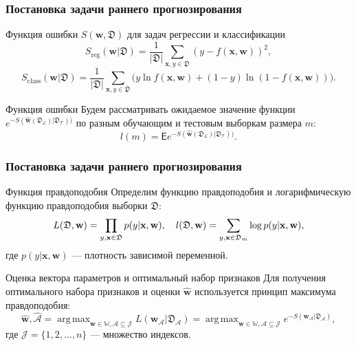 \documentclass{beamer}
\DeclareMathOperator*{\argmax}{arg\,max}
\begin{document}
\begin{frame}
\frametitle{Постановка задачи раннего прогнозирования}

\begin{block}{Функция ошибки $S(\mathbf{w}, \mathfrak{D})$ для задач регрессии и классификации}
$$
S_{\text{reg}}(\textbf{w} | \mathfrak{D}) = \frac{1}{|\mathfrak{D}|}\sum\limits_{\mathbf{x}, y \in \mathfrak{D}}(y - f(\mathbf{x}, \mathbf{w}))^2,
$$
$$
S_{\text{class}}(\textbf{w} | \mathfrak{D}) =  \frac{1}{|\mathfrak{D}|}\sum\limits_{\mathbf{x}, y \in \mathfrak{D}}\bigl(y\ln f(\mathbf{x}, \mathbf{w}) + (1 - y)\ln(1 - f(\mathbf{x}, \mathbf{w}))\bigr).
$$
\end{block}

\begin{block}{Функция ошибки}
Будем рассматривать ожидаемое значение функции $e^{-S(\hat{\mathbf{w}}(\mathfrak{D}_{\mathcal{L}}) | \mathfrak{D}_{\mathcal{T}}))}$ по разным обучающим и тестовым выборкам размера $m$:
$$
l(m) = \mathsf E e^{-S(\hat{\mathbf{w}}(\mathfrak{D}_{\mathcal{L}}) | \mathfrak{D}_{\mathcal{T}}))}.
$$
\end{block}

\end{frame}

\begin{frame}
\frametitle{Постановка задачи раннего прогнозирования}

\begin{block}{Функция правдоподобия}
Определим функцию правдоподобия и логарифмическую функцию правдоподобия выборки $\mathfrak D$:
$$
L(\mathfrak D, \textbf{w}) = \prod_{y, \textbf{x} \in \mathfrak D} p(y | \textbf{x}, \textbf{w}),~~~ l(\mathfrak D, \textbf w) = \sum_{y, \textbf{x} \in \mathfrak D_m}\log p(y | \textbf{x}, \textbf{w}),
$$
где $p(y | \textbf{x}, \textbf{w})$ ---  плотность зависимой переменной.
\end{block}

\begin{block}{Оценка вектора параметров и оптимальный набор признаков}
Для получения оптимального набора признаков и оценки $\hat{\mathbf{w}}$ используется принцип максимума правдоподобия:
$$
\hat{\textbf{w}}, \hat{\mathcal{A}} = \argmax_{\mathbf{w} \in \mathbb{W}, \mathcal{A} \subseteq \mathcal{J}} L(\textbf{w}_{\mathcal{A}} | \mathfrak D_{\mathcal{A}}) = \argmax_{\mathbf{w} \in \mathbb{W}, \mathcal{A} \subseteq \mathcal{J}} e^{-S(\textbf{w}_{\mathcal{A}} | \mathfrak D_{\mathcal{A}})},
$$
где $\mathcal{J} = \{1, 2, ..., n\}$ --- множество индексов.
\end{block}

\end{frame}
\end{document}
